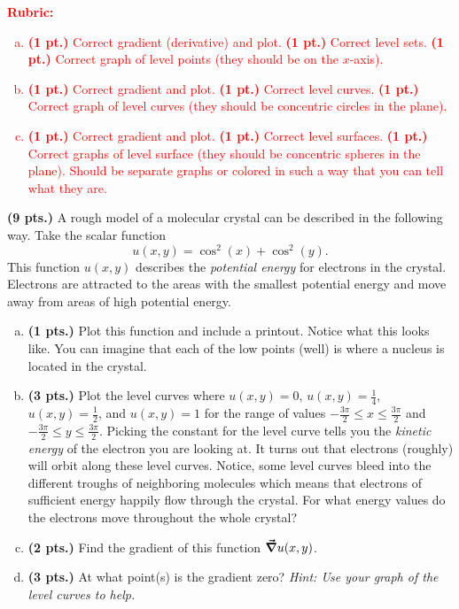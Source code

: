 \documentclass[12pt]{article} %
\begin{document}
\textcolor{red}{
\noindent \textbf{Rubric:}}
\textcolor{red}{
\begin{enumerate}[(a)]
\item \textbf{(1 pt.)} Correct gradient (derivative) and plot. \textbf{(1 pt.)} Correct level sets. \textbf{(1 pt.)} Correct graph of level points (they should be on the $x$-axis).
\item \textbf{(1 pt.)} Correct gradient and plot. \textbf{(1 pt.)} Correct level curves. \textbf{(1 pt.)} Correct graph of level curves (they should be concentric circles in the plane).
\item \textbf{(1 pt.)} Correct gradient and plot. \textbf{(1 pt.)} Correct level surfaces. \textbf{(1 pt.)} Correct graphs of level surface (they should be concentric spheres in the plane). Should be separate graphs or colored in such a way that you can tell what they are.
\end{enumerate}
}
\newpage

\begin{problem}
\textbf{(9 pts.)} A rough model of a molecular crystal can be described in the following way. Take the scalar function
\[
u(x,y)=\cos^2(x)+\cos^2(y).
\]
This function $u(x,y)$ describes the \emph{potential energy} for electrons in the crystal. Electrons are attracted to the areas with the smallest potential energy and move away from areas of high potential energy.
\begin{enumerate}[(a)]
    \item \textbf{(1 pts.)} Plot this function and include a printout.  Notice what this looks like.  You can imagine that each of the low points (well) is where a nucleus is located in the crystal.
    \item \textbf{(3 pts.)} Plot the level curves where $u(x,y)=0$, $u(x,y)=\frac{1}{4}$, $u(x,y)=\frac{1}{2}$, and $u(x,y)=1$ for the range of values $-\frac{3\pi}{2}\leq x \leq \frac{3\pi}{2}$ and $-\frac{3\pi}{2}\leq y \leq \frac{3\pi}{2}$. Picking the constant for the level curve tells you the \emph{kinetic energy} of the electron you are looking at.  It turns out that electrons (roughly) will orbit along these level curves.  Notice, some level curves bleed into the different troughs of neighboring molecules which means that electrons of sufficient energy happily flow through the crystal. For what energy values do the electrons move throughout the whole crystal?
    \item \textbf{(2 pts.)} Find the gradient of this function $\boldsymbol{\vec{\nabla}} u(x,y)$.
    \item \textbf{(3 pts.)} At what point(s) is the gradient zero? \emph{Hint: Use your graph of the level curves to help.}
    \end{enumerate}
\end{problem}
\end{document}
